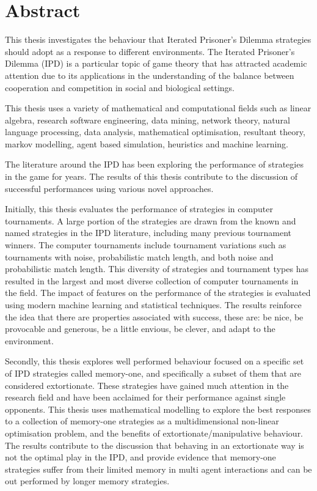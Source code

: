 \chapter{Abstract}

This thesis investigates the behaviour that Iterated Prisoner's Dilemma
strategies should adopt as a response to different environments. The Iterated
Prisoner's Dilemma (IPD) is a particular topic of game theory that has attracted
academic attention due to its applications in the understanding of
the balance between cooperation and competition in social and biological
settings.

This thesis uses a variety of mathematical and computational fields such as
linear algebra, research software engineering, data mining, network
theory, natural language processing, data analysis, mathematical
optimisation, resultant theory, markov modelling, agent based simulation,
heuristics and machine learning.

The literature around the IPD has been exploring the performance of strategies
in the game for years. The results of this thesis contribute to the discussion
of successful performances using various novel approaches.

Initially, this thesis evaluates the performance of \numberofstrategies
strategies in \numberofalltournaments computer tournaments. A large portion of
the \numberofstrategies strategies are drawn from the known and named strategies in the IPD
literature, including many previous tournament winners. The \numberofalltournaments
computer tournaments include tournament variations such as tournaments with
noise, probabilistic match length, and both noise and probabilistic match
length. This diversity of strategies and tournament types has resulted in the largest and
most diverse collection of computer tournaments in the field. The impact of
features on the performance of the \numberofstrategies strategies is evaluated
using modern machine learning and statistical techniques. The results reinforce
the idea that there are properties associated with success, these are: be nice,
be provocable and generous, be a little envious, be clever, and adapt to the
environment.

Secondly, this thesis explores  well performed behaviour focused on a specific set of
IPD strategies called memory-one, and specifically a subset of them that are
considered extortionate. These strategies have gained much attention in the
research field and have been acclaimed for their performance against single
opponents. This thesis uses  mathematical modelling to explore the best
responses to a collection of memory-one strategies as a multidimensional non-linear
optimisation problem, and the benefits of extortionate/manipulative
behaviour. The results contribute to the discussion that behaving in an
extortionate way is not the optimal play in the IPD, and provide evidence that
memory-one strategies suffer from their limited memory in multi agent
interactions and can be out performed by longer memory strategies.

